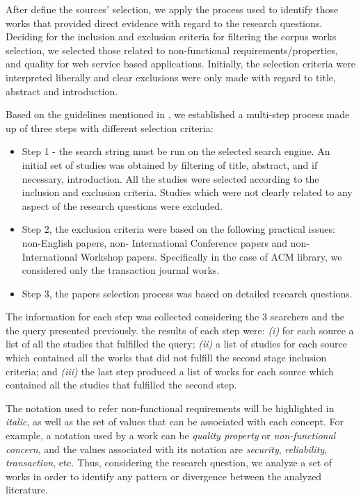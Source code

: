 \documentclass{sig-alternate}
\begin{document}
After define the sources' selection, we apply the
process used to identify those works that provided direct
evidence with regard to the research questions. Deciding
for the inclusion and exclusion criteria for filtering the corpus works
selection, we selected those related to non-functional requirements/properties,
and quality for web service based applications. Initially, the selection
criteria were interpreted liberally and clear exclusions were only made with
regard to title, abstract and introduction.

Based on the guidelines mentioned in \cite{Kitchenham08}, we established a
multi-step process made up of three steps with different selection
criteria:

\begin{itemize}
\item Step 1 - the search string must be run on the selected
search engine. An initial set of studies was obtained by filtering
of title, abstract, and if necessary, introduction. All the studies were
selected according to the inclusion and exclusion criteria. Studies which
were not clearly related to any aspect of the research questions
were excluded.
\item Step 2, the exclusion criteria were based on the following
practical issues: non-English papers, non-
International Conference papers and non-International Workshop
papers. Specifically in the case of ACM library, we considered only the
transaction journal works.
\item Step 3, the papers selection process was based on detailed
research questions.
\end{itemize}

The information for each step was collected considering the 3 searchers
and the the query presented previously. the results of each step were:
\textit{(i)} for each source a list of all the studies that
fulfilled the query; \textit{(ii)} a list
of studies for each source which contained all the works that did not fulfill the
second stage inclusion criteria; and
\textit{(iii)} the last step produced a list of works for each source which
contained all the studies that fulfilled the second step.


The notation used to refer non-functional requirements will be highlighted in
\textit{italic}, as well as the set of values that can be associated with each
concept. For example, a notation used by a work can be \textit{quality property}
or \textit{non-functional concern}, and the values associated with
its notation are \textit{security}, \textit{reliability}, \textit{transaction},
etc. Thus, considering the research question, we analyze a set of works in order
to identify any pattern or divergence between the analyzed literature. 
\end{document}
